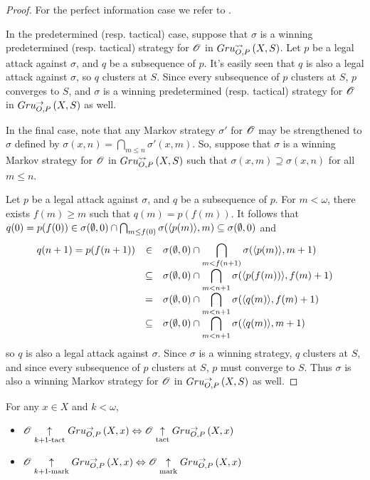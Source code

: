 \begin{proof}
  For the perfect information case we refer to \cite{MR0413049}.

  In the predetermined (resp. tactical) case, suppose that $\sigma$ is a
  winning predetermined (resp. tactical) strategy for $\mathscr{O}$ in
  $Gru_{O,P}^{\leadsto}\left({X},{S}\right)$. Let $p$ be a legal attack against $\sigma$, and $q$ be a
  subsequence of $p$. It's easily seen that $q$ is also a legal attack against
  $\sigma$, so $q$ clusters at $S$. Since every subsequence of $p$ clusters
  at $S$, $p$ converges to $S$, and $\sigma$ is a winning predetermined
  (resp. tactical) strategy for $\mathscr{O}$ in $Gru_{O,P}^{\to}\left({X},{S}\right)$ as well.

  In the final case, note that any Markov strategy $\sigma'$ for $\mathscr{O}$ may
  be strengthened to $\sigma$ defined by
  $\sigma(x,n)=\bigcap_{m\leq n}\sigma'(x,m)$.
  So, suppose that $\sigma$ is a winning Markov strategy for $\mathscr{O}$ in
  $Gru_{O,P}^{\leadsto}\left({X},{S}\right)$ such that $\sigma(x,m)\supseteq\sigma(x,n)$ for all
  $m\leq n$.

  Let $p$ be a legal attack against $\sigma$, and $q$ be a subsequence of $p$.
  For $m<\omega$, there exists $f(m)\geq m$ such that $q(m)=p(f(m))$. It follows
  that
    $
      q(0)=p(f(0))
        \in
      \sigma(\emptyset,0)\cap \bigcap_{m\leq f(0)}\sigma(\langle p(m)\rangle,m)
        \subseteq
      \sigma(\emptyset,0)
    $
  and
    \[
      \begin{array}{rcl}
        q(n+1)=p(f(n+1)) &
          \in &
        \displaystyle
        \sigma(\emptyset,0)\cap \bigcap_{m<f(n+1)}\sigma(\langle p(m)\rangle,m+1) \\ &
          \subseteq &
        \displaystyle
        \sigma(\emptyset,0)\cap \bigcap_{m<n+1}\sigma(\langle p(f(m))\rangle,f(m)+1) \\ &
          = &
        \displaystyle
        \sigma(\emptyset,0)\cap \bigcap_{m<n+1}\sigma(\langle q(m)\rangle,f(m)+1) \\ &
          \subseteq &
        \displaystyle
        \sigma(\emptyset,0)\cap \bigcap_{m<n+1}\sigma(\langle q(m)\rangle,m+1)
      \end{array}
    \]
  so $q$ is also a legal attack against $\sigma$. Since $\sigma$ is a winning
  strategy, $q$ clusters at $S$, and since every subsequence of $p$ clusters
  at $S$, $p$ must converge to $S$. Thus $\sigma$ is also a winning Markov
  strategy for $\mathscr{O}$ in $Gru_{O,P}^{\to}\left({X},{S}\right)$ as well.
\end{proof}

\begin{prop} For any $x\in X$ and $k<\omega$,
  \begin{itemize}
    \item
      $
      \mathscr{O}\underset{k+1\text{-tact}}{\uparrow}Gru_{O,P}^{\to}\left({X},{x}\right)
        \Leftrightarrow
      \mathscr{O}\underset{\text{tact}}{\uparrow}Gru_{O,P}^{\to}\left({X},{x}\right)
      $
    \item
      $
      \mathscr{O}\underset{k+1\text{-mark}}{\uparrow}Gru_{O,P}^{\to}\left({X},{x}\right)
        \Leftrightarrow
      \mathscr{O}\underset{\text{mark}}{\uparrow}Gru_{O,P}^{\to}\left({X},{x}\right)
      $
  \end{itemize}
\end{prop}


